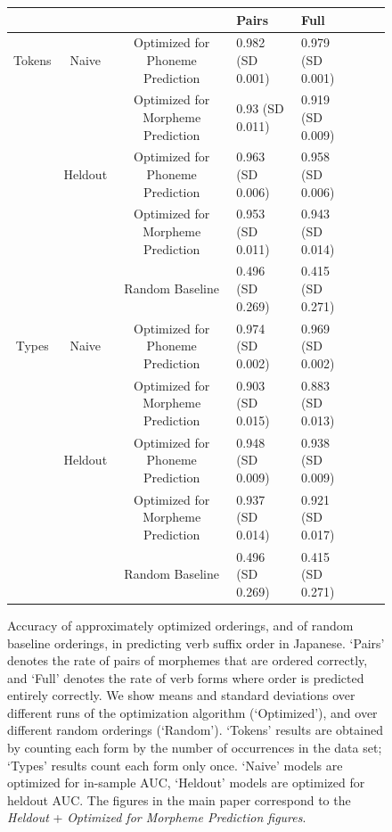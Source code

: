 \documentclass[11pt,letterpaper]{article}
\begin{document}
\begin{figure} %
\begin{center}
\begin{tabular}{ccc||llll}
	& &              &       Pairs & Full \\ \hline\hline
Tokens & Naive   & Optimized for Phoneme Prediction   &   0.982 (SD 0.001) & 0.979 (SD 0.001) \\
       &         & Optimized for Morpheme Prediction  &   0.93 (SD 0.011) & 0.919 (SD 0.009) \\ \hline
       & Heldout & Optimized for Phoneme Prediction   &   0.963 (SD 0.006) & 0.958 (SD 0.006) \\
       &         & Optimized for Morpheme Prediction  &   0.953 (SD 0.011) & 0.943 (SD 0.014) \\ \hline
       &         &                 Random Baseline    &  0.496 (SD 0.269) & 0.415 (SD 0.271) \\ \hline\hline
Types & Naive    & Optimized for Phoneme Prediction   &   0.974 (SD 0.002) & 0.969 (SD 0.002) \\
      &          & Optimized for Morpheme Prediction  &   0.903 (SD 0.015) & 0.883 (SD 0.013) \\ \hline
      & Heldout  & Optimized for Phoneme Prediction   &   0.948 (SD 0.009) & 0.938 (SD 0.009) \\
      &          & Optimized for Morpheme Prediction  &   0.937 (SD 0.014) & 0.921 (SD 0.017) \\ \hline
      &          & Random Baseline    &  0.496 (SD 0.269) & 0.415 (SD 0.271) \\
\end{tabular}
\end{center}
\caption{Accuracy of approximately optimized orderings, and of random baseline orderings, in predicting verb suffix order in Japanese. `Pairs' denotes the rate of pairs of morphemes that are ordered correctly, and `Full' denotes the rate of verb forms where order is predicted entirely correctly. We show means and standard deviations over different runs of the optimization algorithm (`Optimized'), and over different random orderings (`Random'). `Tokens' results are obtained by counting each form by the number of occurrences in the data set; `Types' results count each form only once. `Naive' models are optimized for in-sample AUC, `Heldout' models are optimized for heldout AUC. The figures in the main paper correspond to the \emph{Heldout} + \emph{Optimized for Morpheme Prediction figures}.}\label{fig:acc-japanese}
\end{figure}
\end{document}
